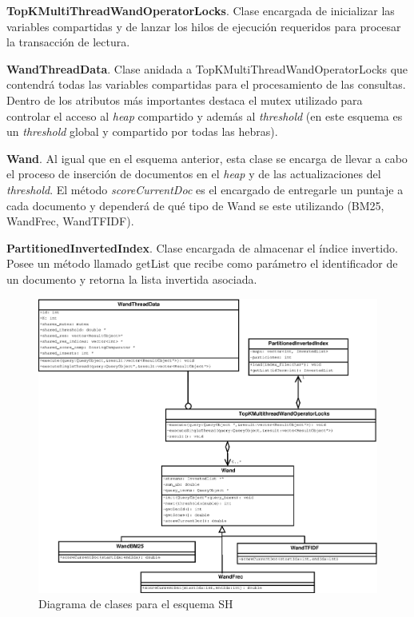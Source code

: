 \begin{list}{}{}
	\item \textbf{TopKMultiThreadWandOperatorLocks}. Clase encargada de inicializar las variables compartidas y de lanzar los hilos de ejecución requeridos para procesar la transacción de lectura.
	
	\item \textbf{WandThreadData}. Clase anidada a TopKMultiThreadWandOperatorLocks que contendrá todas las variables compartidas para el procesamiento de las consultas. Dentro de los atributos más importantes destaca el mutex utilizado para controlar el acceso al \textit{heap} compartido y además al \textit{threshold} (en este esquema es un \textit{threshold} global y compartido por todas las hebras).
	
	\item \textbf{Wand}. Al igual que en el esquema anterior, esta clase se encarga de llevar a cabo el proceso de inserción de documentos en el \textit{heap} y de las actualizaciones del \textit{threshold}. El método \textit{scoreCurrentDoc} es el encargado de entregarle un puntaje a cada documento y dependerá de qué tipo de Wand se este utilizando (BM25, WandFrec, WandTFIDF). 

	\item \textbf{PartitionedInvertedIndex}. Clase encargada de almacenar el índice invertido. Posee un método llamado getList que recibe como parámetro el identificador de un documento y retorna la lista invertida asociada. 

\end{list}

\begin{figure}[!ht]
\centering
\includegraphics[scale=.75]{images/TopKMultiThreadWandOperatorLocks.eps}
\caption{Diagrama de clases para el esquema SH}
\label{fig:TopKMultiThreadWandOperatorLocks}
\end{figure}

